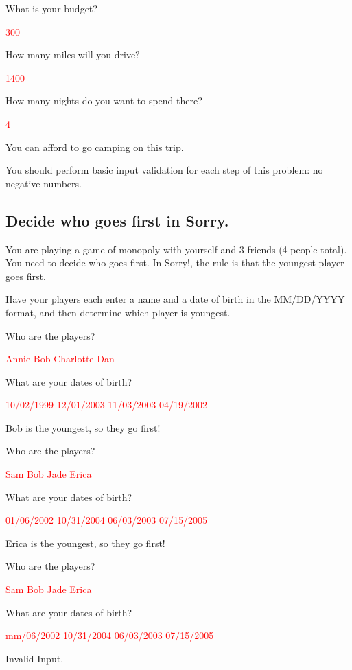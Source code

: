 \begin{sample}
What is your budget?

\textcolor{red}{300}

How many miles will you drive?

\textcolor{red}{1400}

How many nights do you want to spend there?

\textcolor{red}{4}

You can afford to go camping on this trip.
\end{sample}

You should perform basic input validation for each step of this problem: no negative numbers. 

\subsection{Decide who goes first in Sorry.}
You are playing a game of monopoly with yourself and 3 friends (4 people total). You need to decide who goes first. In Sorry!, the rule is that the youngest player goes first. 

Have your players each enter a name and a date of birth in the MM/DD/YYYY format, and then determine which player is youngest.

\begin{sample}
Who are the players?

\textcolor{red}{Annie Bob Charlotte Dan}

What are your dates of birth?

\textcolor{red}{10/02/1999 12/01/2003 11/03/2003 04/19/2002}

Bob is the youngest, so they go first!
\end{sample}

\begin{sample}
Who are the players?

\textcolor{red}{Sam Bob Jade Erica}

What are your dates of birth?

\textcolor{red}{01/06/2002 10/31/2004 06/03/2003 07/15/2005}

Erica is the youngest, so they go first!
\end{sample}

\begin{sample}
Who are the players?

\textcolor{red}{Sam Bob Jade Erica}

What are your dates of birth?

\textcolor{red}{mm/06/2002 10/31/2004 06/03/2003 07/15/2005}

Invalid Input.
\end{sample}

